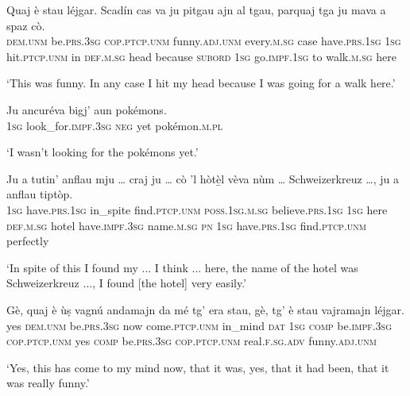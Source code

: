 \begin{linenumbers}
	\gll Quaj è stau léjgar. Scadín cas va ju pitgau ajn al tgau, parquaj tga ju mava a spaz cò.   \\
	\textsc{dem.unm} be.\textsc{prs.3sg} \textsc{cop.ptcp.unm} funny.\textsc{adj.unm} every.\textsc{m.sg} case have.\textsc{prs.1sg} \textsc{1sg} hit.\textsc{ptcp.unm} in \textsc{def.m.sg} head because \textsc{subord} \textsc{1sg} go.\textsc{impf.1sg} to walk.\textsc{m.sg} here \\
\end{linenumbers}
\medskip
\glt `This was funny. In any case I hit my head because I was going for a walk here.'
\medskip

\begin{linenumbers}
	\gll  Ju ancuréva bigj' aun pokémons.\\
	\textsc{1sg} look\_for.\textsc{impf.3sg} \textsc{neg} yet pokémon.\textsc{m.pl}\\
\end{linenumbers}
\medskip
\glt `I wasn't looking for the pokémons yet.'
\medskip

\begin{linenumbers}
	\gll Ju a tutin’ anflau mju … craj ju … cò ’l hòtè̱l vèva nùm … Schweizerkreuz …, ju a anflau tiptòp.   \\
 	\textsc{1sg} have.\textsc{prs.1sg} in\_spite find.\textsc{ptcp.unm} \textsc{poss.1sg.m.sg} {} believe.\textsc{prs.1sg} \textsc{1sg} {} here \textsc{def.m.sg} hotel have.\textsc{impf.3sg} name.\textsc{m.sg} {} \textsc{pn} {} \textsc{1sg} have.\textsc{prs.1sg} find.\textsc{ptcp.unm} perfectly\\
\end{linenumbers}
\medskip
\glt `In spite of this I found my ... I think ... here, the name of the hotel was Schweizerkreuz ..., I found [the hotel] very easily.'
\medskip

\begin{linenumbers}
	\gll Gè, quaj è ùṣ vagnú andamajn da mé tg’ era stau, gè, tg’ è stau vajramajn léjgar.   \\
	yes \textsc{dem.unm} be.\textsc{prs.3sg} now come.\textsc{ptcp.unm} in\_mind \textsc{dat} \textsc{1sg} \textsc{comp} be.\textsc{impf.3sg} \textsc{cop.ptcp.unm} yes \textsc{comp} be.\textsc{prs.3sg} \textsc{cop.ptcp.unm} real.\textsc{f.sg.adv} funny.\textsc{adj.unm} \\
\end{linenumbers}
\medskip
\glt `Yes, this has come to my mind now, that it was, yes, that it had been, that it was really funny.'
\bigskip

